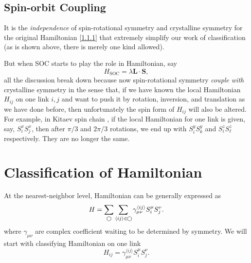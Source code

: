 \documentclass[10pt,nofootinbib]{revtex4}
\newcommand\hexagon{\mathop{\begin{tikzpicture}[scale=0.06,baseline]
		\draw (0,-1) -- (1.732,0) -- (1.732,2) -- (0,3) -- (-1.732,2) -- (-1.732,0) -- (0,-1);
	\end{tikzpicture}}}
\begin{document}
	\subsection{Spin-orbit Coupling}
		It is the \emph{independence} of spin-rotational symmetry and crystalline symmetry for the original Hamiltonian \eqref{1.1.1} that extremely simplify our work of classification (as is shown above, there is merely one kind allowed).\par
		But when SOC starts to play the role in Hamiltonian, say
		\begin{equation}\label{1.2.1}
			H_{\text{SOC}}=\lambda\bm{L}\cdot\bm{S},
		\end{equation}
		all the discussion break down because now spin-rotational symmetry \emph{couple with} crystalline symmetry in the sense that, if we have known the local Hamiltonian $H_{ij}$ on one link $i,j$ and want to push it by rotation, inversion, and translation as we have done before, then unfortunately the spin form of $H_{ij}$ will also be altered. For example, in Kitaev spin chain \cite{kitaev2006anyons}, if the local Hamiltonian for one link is given, say, $S_i^xS_j^x$, then after $\pi/3$ and $2\pi/3$ rotations, we end up with $S_i^yS_k^y$ and $S_i^zS_\ell^z$ respectively. They are no longer the same.


\section{Classification of Hamiltonian}
	At the nearest-neighbor level, Hamiltonian can be generally expressed as
	\begin{equation}\label{2.0.1}
		H=\sum_{\hexagon}\sum_{\langle ij \rangle\in\hexagon}\gamma_{\mu\nu}^{\langle ij \rangle }S_i^\mu S_j^\nu.
	\end{equation}
	where $\gamma_{\mu\nu}$ are complex coefficient waiting to be determined by symmetry. We will start with classifying Hamiltonian on one link
	\begin{equation}\label{2.0.2}
		H_{ij}=\gamma_{\mu\nu}^{\langle ij \rangle }S_i^\mu S_{j}^\nu.
	\end{equation}
\end{document}
